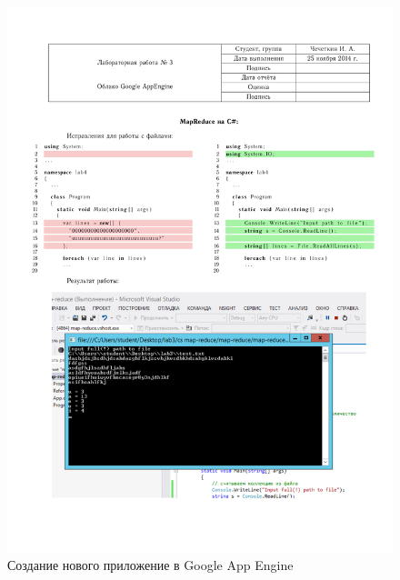 \documentclass[pscyr,10pt]{hedlab}
\begin{document}
  \begin{figure}[h!]
    \center
    \includegraphics[width=.7\textwidth]{03} \\
    Создание нового приложение в Google App Engine
  \end{figure}
  
  \newpage
  
\end{document}
